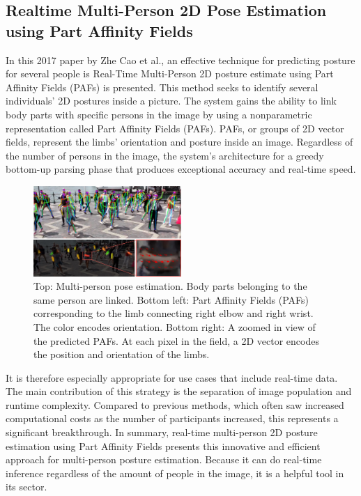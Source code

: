 \documentclass[runningheads]{llncs}
\begin{document}
    \subsection{Realtime Multi-Person 2D Pose Estimation using Part Affinity Fields \parencite{cao2017realtimemultiperson2dpose}}
        In this 2017 paper by Zhe Cao et al., an effective technique for predicting posture for several people is Real-Time Multi-Person 2D posture estimate using Part Affinity Fields (PAFs) is presented. This method seeks to identify several individuals' 2D postures inside a picture. The system gains the ability to link body parts with specific persons in the image by using a nonparametric representation called Part Affinity Fields (PAFs). PAFs, or groups of 2D vector fields, represent the limbs' orientation and posture inside an image. Regardless of the number of persons in the image, the system's architecture for a greedy bottom-up parsing phase that produces exceptional accuracy and real-time speed.\\

        \begin{figure}[htbp]
            \centering
            \includegraphics[width=0.5\textwidth]{figures/multipose.png}
            \caption{Top: Multi-person pose estimation. Body parts belonging to the same person are linked. Bottom left: Part Affinity Fields (PAFs) corresponding to the limb connecting right elbow and right wrist. The color encodes orientation. Bottom right: A zoomed in view of the predicted PAFs. At each pixel in the field, a 2D vector encodes the position and orientation of the limbs.}
        \end{figure}

        It is therefore especially appropriate for use cases that include real-time data. The main contribution of this strategy is the separation of image population and runtime complexity. Compared to previous methods, which often saw increased computational costs as the number of participants increased, this represents a significant breakthrough. In summary, real-time multi-person 2D posture estimation using Part Affinity Fields presents this innovative and efficient approach for multi-person posture estimation. Because it can do real-time inference regardless of the amount of people in the image, it is a helpful tool in its sector. 
\end{document}
